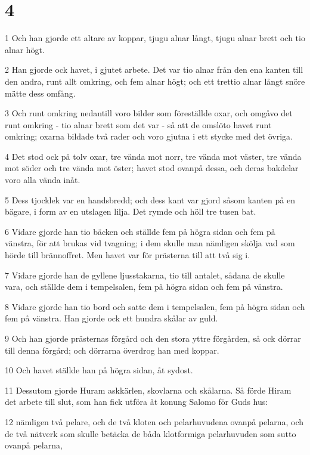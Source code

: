 \chapter{4}

\par 1 Och han gjorde ett altare av koppar, tjugu alnar långt, tjugu alnar brett och tio alnar högt.
\par 2 Han gjorde ock havet, i gjutet arbete. Det var tio alnar från den ena kanten till den andra, runt allt omkring, och fem alnar högt; och ett trettio alnar långt snöre mätte dess omfång.
\par 3 Och runt omkring nedantill voro bilder som föreställde oxar, och omgåvo det runt omkring - tio alnar brett som det var - så att de omslöto havet runt omkring; oxarna bildade två rader och voro gjutna i ett stycke med det övriga.
\par 4 Det stod ock på tolv oxar, tre vända mot norr, tre vända mot väster, tre vända mot söder och tre vända mot öster; havet stod ovanpå dessa, och deras bakdelar voro alla vända inåt.
\par 5 Dess tjocklek var en handsbredd; och dess kant var gjord såsom kanten på en bägare, i form av en utslagen lilja. Det rymde och höll tre tusen bat.
\par 6 Vidare gjorde han tio bäcken och ställde fem på högra sidan och fem på vänstra, för att brukas vid tvagning; i dem skulle man nämligen skölja vad som hörde till brännoffret. Men havet var för prästerna till att två sig i.
\par 7 Vidare gjorde han de gyllene ljusstakarna, tio till antalet, sådana de skulle vara, och ställde dem i tempelsalen, fem på högra sidan och fem på vänstra.
\par 8 Vidare gjorde han tio bord och satte dem i tempelsalen, fem på högra sidan och fem på vänstra. Han gjorde ock ett hundra skålar av guld.
\par 9 Och han gjorde prästernas förgård och den stora yttre förgården, så ock dörrar till denna förgård; och dörrarna överdrog han med koppar.
\par 10 Och havet ställde han på högra sidan, åt sydost.
\par 11 Dessutom gjorde Huram askkärlen, skovlarna och skålarna. Så förde Hiram det arbete till slut, som han fick utföra åt konung Salomo för Guds hus:
\par 12 nämligen två pelare, och de två kloten och pelarhuvudena ovanpå pelarna, och de två nätverk som skulle betäcka de båda klotformiga pelarhuvuden som sutto ovanpå pelarna,
